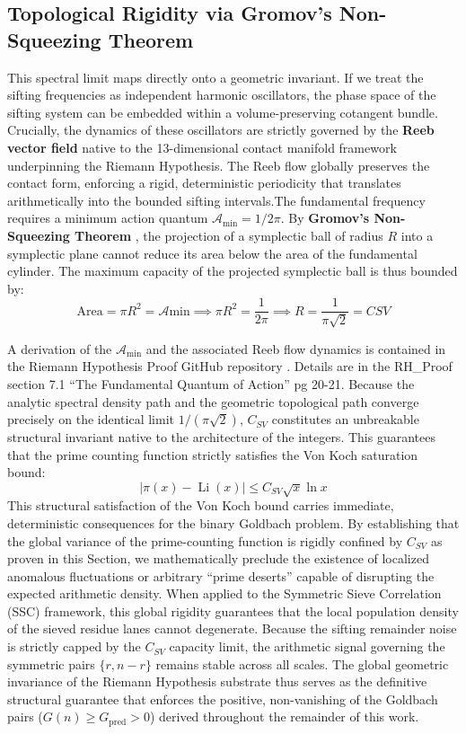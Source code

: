 \documentclass[sn-mathphys-num, pdflatex]{sn-jnl}
\begin{document}
\subsection{Topological Rigidity via Gromov's Non-Squeezing Theorem}
This spectral limit maps directly onto a geometric invariant. If we treat the sifting frequencies as independent harmonic oscillators, the phase space of the sifting system can be embedded within a volume-preserving cotangent bundle. Crucially, the dynamics of these oscillators are strictly governed by the \textbf{Reeb vector field} native to the 13-dimensional contact manifold framework underpinning the Riemann Hypothesis. The Reeb flow globally preserves the contact form, enforcing a rigid, deterministic periodicity that translates arithmetically into the bounded sifting intervals.The fundamental frequency requires a minimum action quantum $\mathcal{A}_{\text{min}} = 1/2\pi$. By \textbf{Gromov's Non-Squeezing Theorem} \cite{mcduff2017introduction}, the projection of a symplectic ball of radius $R$ into a symplectic plane cannot reduce its area below the area of the fundamental cylinder. The maximum capacity of the projected symplectic ball is thus bounded by:
\begin{equation*}
\text{Area} = \pi R^2 = \mathcal{A}{\text{min}} \implies \pi R^2 = \frac{1}{2\pi} \implies R = \frac{1}{\pi\sqrt{2}} = C{SV}
\end{equation*}

A derivation of the $\mathcal{A}_{\text{min}}$ and the associated Reeb flow dynamics is contained in the Riemann Hypothesis Proof GitHub repository \cite{Rock2026Repository}. Details are in the RH\_Proof section 7.1 ``The Fundamental Quantum of Action'' pg 20-21. Because the analytic spectral density path and the geometric topological path converge precisely on the identical limit $1/(\pi\sqrt{2})$, $C_{SV}$ constitutes an unbreakable structural invariant native to the architecture of the integers. This guarantees that the prime counting function strictly satisfies the Von Koch saturation bound:
\begin{equation*}|\pi(x) - \operatorname{Li}(x)| \le C_{SV} \sqrt{x} \ln x\end{equation*}
This structural satisfaction of the Von Koch bound carries immediate, deterministic consequences for the binary Goldbach problem. By establishing that the global variance of the prime-counting function is rigidly confined by $C_{SV}$ as proven in this Section, we mathematically preclude the existence of localized anomalous fluctuations or arbitrary ``prime deserts'' capable of disrupting the expected arithmetic density. When applied to the Symmetric Sieve Correlation (SSC) framework, this global rigidity guarantees that the local population density of the sieved residue lanes cannot degenerate. Because the sifting remainder noise is strictly capped by the $C_{SV}$ capacity limit, the arithmetic signal governing the symmetric pairs $\{r, n-r\}$ remains stable across all scales. The global geometric invariance of the Riemann Hypothesis substrate thus serves as the definitive structural guarantee that enforces the positive, non-vanishing of the Goldbach pairs ($G(n) \ge G_{\text{pred}} > 0$) derived throughout the remainder of this work.
\end{document}
